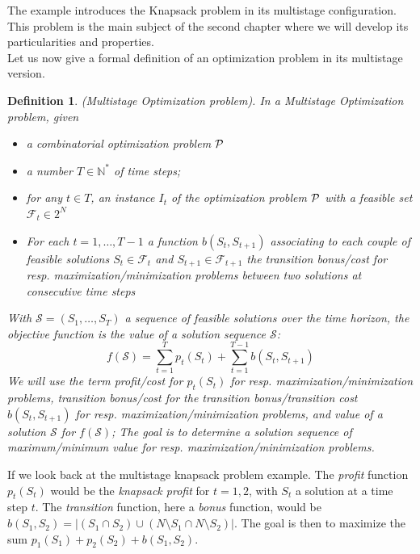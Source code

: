 \documentclass[a4paper]{book}
\newtheorem{definition}{Definition}
\begin{document}
The example introduces the {\sc Knapsack} problem in its multistage configuration. This problem is the main subject of the second chapter where we will develop its particularities and properties.\\

Let us now give a formal definition of an optimization problem in its multistage version. 
\begin{definition}{\emph{(Multistage Optimization problem).}} In a Multistage Optimization problem, given 
\begin{itemize}
\item a combinatorial optimization problem $\cal P$ 
\item a number $T \in \mathbb{N}^*$ of time steps;
\item for any $t \in T$, an instance $I_t$ of the optimization problem $\cal P$ with a feasible set $\mathcal{F}_t\in 2^N$


\item For each $t=1, \ldots, T-1$ a function $b(S_t,S_{t+1})$ associating to each couple of feasible solutions $S_t \in \mathcal{F}_t$ and $S_{t+1} \in \mathcal{F}_{t+1}$ the transition bonus/cost for resp. maximization/minimization problems between two solutions at consecutive time steps 
\end{itemize}
With $\mathcal{S}=(S_1,\dots,S_T)$ a sequence of feasible solutions over the time horizon, the objective function is the value of a solution sequence $\mathcal{S}$: $$f(\mathcal{S})=\sum_{t=1}^T p_t(S_t) + \sum_{t=1}^{T-1} b(S_t,S_{t+1})$$
We will use the term {\it profit}/cost for $ p_t(S_t)$ for resp. maximization/minimization problems, transition {\it bonus}/cost for the transition bonus/transition cost $b(S_t,S_{t+1})$ for resp. maximization/minimization problems, and {\it value} of a solution $\mathcal{S}$ for $f(\mathcal{S})$;
The goal is to determine a solution sequence of maximum/minimum value for resp. maximization/minimization problems. 

\end{definition}

If we look back at the {\sc multistage knapsack} problem example. The \textit{profit} function $p_t(S_t)$ would be the \textit{knapsack profit} for $t=1,2$, with $S_t$ a solution at a time step $t$. The \textit{transition} function, here a \textit{bonus} function, would be $b(S_1,S_{2})=|(S_1\cap S_2) \cup (N\setminus S_1 \cap N\setminus S_2)|$. The goal is then to maximize the sum $p_1(S_1)+p_2(S_2)+b(S_1,S_{2})$.
\end{document}
